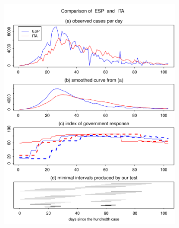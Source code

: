\documentclass[a4paper,12pt]{article}
\numberwithin{equation}{section}
\begin{document}
\begin{figure}[t!]
\begin{subfigure}[b]{0.475\textwidth}
\includegraphics[width=\textwidth]{plots/ESP_vs_ITA}
\end{subfigure}\hspace{0.55cm}
\begin{subfigure}[b]{0.475\textwidth}

\end{subfigure}
\end{figure}
\end{document}
